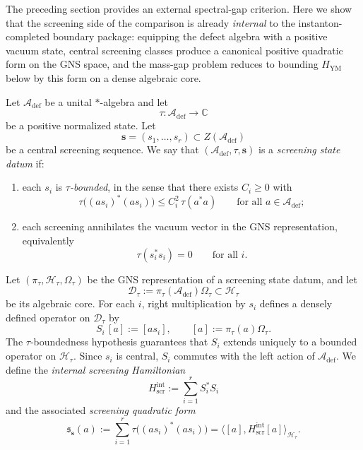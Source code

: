 The preceding section provides an external spectral-gap criterion.
Here we show that the screening side of the comparison is already
\emph{internal} to the instanton-completed boundary package: equipping
the defect algebra with a positive vacuum state, central screening
classes produce a canonical positive quadratic form on the GNS space,
and the mass-gap problem reduces to bounding $H_{\mathrm{YM}}$ below
by this form on a dense algebraic core.

\begin{definition}
\label{def:screening-state-datum}
Let $\mathcal A_{\mathrm{def}}$ be a unital $*$-algebra and let
\[
\tau\colon \mathcal A_{\mathrm{def}}\longrightarrow \mathbb C
\]
be a positive normalized state. Let
\[
\mathbf s=(s_1,\dots,s_r)\subset Z(\mathcal A_{\mathrm{def}})
\]
be a central screening sequence.
We say that $(\mathcal A_{\mathrm{def}},\tau,\mathbf s)$ is a \emph{screening state datum} if:
\begin{enumerate}[label=(\roman*)]
\item each $s_i$ is \emph{$\tau$-bounded}, in the sense that there exists $C_i\ge 0$ with
\[
\tau\bigl((a s_i)^*(a s_i)\bigr)\le C_i^2\,\tau(a^*a)
\qquad\text{for all }a\in \mathcal A_{\mathrm{def}};
\]
\item each screening annihilates the vacuum vector in the GNS representation, equivalently
\[
\tau(s_i^*s_i)=0
\qquad\text{for all }i.
\]
\end{enumerate}
\end{definition}

\begin{construction}
\label{constr:internal-screening-operators}
Let $(\pi_\tau,\mathcal H_\tau,\Omega_\tau)$ be the GNS representation of a screening state datum,
and let
\[
\mathcal D_\tau:=\pi_\tau(\mathcal A_{\mathrm{def}})\Omega_\tau\subset \mathcal H_\tau
\]
be its algebraic core.
For each $i$, right multiplication by $s_i$ defines a densely defined operator on $\mathcal D_\tau$ by
\[
S_i\,[a]:=[a s_i],
\qquad [a]:=\pi_\tau(a)\Omega_\tau.
\]
The $\tau$-boundedness hypothesis guarantees that $S_i$ extends uniquely to a bounded operator on $\mathcal H_\tau$.
Since $s_i$ is central, $S_i$ commutes with the left action of $\mathcal A_{\mathrm{def}}$.
We define the \emph{internal screening Hamiltonian}
\[
H_{\mathrm{scr}}^{\mathrm{int}}:=\sum_{i=1}^r S_i^*S_i
\]
and the associated \emph{screening quadratic form}
\[
\mathfrak s_{\mathbf s}(a):=\sum_{i=1}^r \tau\bigl((a s_i)^*(a s_i)\bigr)
=\bigl\langle [a],H_{\mathrm{scr}}^{\mathrm{int}}[a]\bigr\rangle_{\mathcal H_\tau}.
\]
\end{construction}

